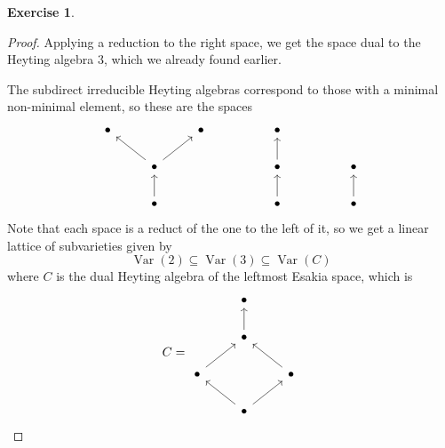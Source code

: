 \documentclass{article}
\DeclareMathOperator{\var}{Var}
\theoremstyle{definition}
\newtheorem{question}{Exercise}
\begin{document}
\begin{question}
\begin{proof}
        Applying a reduction to the right space, we get the space dual to the
        Heyting algebra \(3\), which we already found earlier.

        The subdirect irreducible Heyting algebras correspond to those with a
        minimal non-minimal element, so these are the spaces
        \[
            \begin{tikzcd}[ampersand replacement=\&]
                \bullet \&\& \bullet \&\& \bullet \\
                \& \bullet \&\&\& \bullet \&\& \bullet \\
                \& \bullet \&\&\& \bullet \&\& \bullet
                \arrow[from=2-2, to=1-1]
                \arrow[from=2-2, to=1-3]
                \arrow[from=3-2, to=2-2]
                \arrow[from=2-5, to=1-5]
                \arrow[from=3-5, to=2-5]
                \arrow[from=3-7, to=2-7]
            \end{tikzcd}
        \]
        Note that each space is a reduct of the one to the left of it,
        so we get a linear lattice of subvarieties given by
        \[
            \var(2)\subseteq\var(3)\subseteq\var(C)
        \]
        where \(C\) is the dual Heyting algebra of the leftmost Esakia space,
        which is
        \[
            C=\begin{tikzcd}[ampersand replacement=\&]
                \& \bullet \\
                \& \bullet \\
                \bullet \&\& \bullet \\
                \& \bullet
                \arrow[from=4-2, to=3-1]
                \arrow[from=4-2, to=3-3]
                \arrow[from=3-3, to=2-2]
                \arrow[from=3-1, to=2-2]
                \arrow[from=2-2, to=1-2]
            \end{tikzcd}
        \]
    \end{proof}
\end{question}
\end{document}
